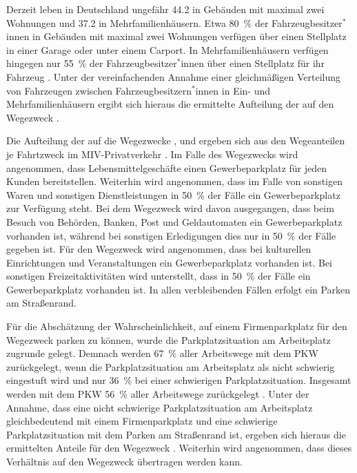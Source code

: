 

Derzeit leben in Deutschland ungefähr \SI{44.2}{\MioMen} in Gebäuden mit maximal zwei Wohnungen und \SI{37.2}{\MioMen} in Mehrfamilienhäusern.
Etwa \SI{80}{\percent} der \linebreak Fahrzeugbesitzer$^*$innen in Gebäuden mit maximal zwei Wohnungen verfügen über einen Stellplatz in einer Garage oder unter einem Carport.
In Mehrfamilienhäusern verfügen hingegen nur \SI{55}{\percent} der Fahrzeugbesitzer$^*$innen über einen Stellplatz für ihr Fahrzeug \cite{dena2020}.
Unter der vereinfachenden Annahme einer gleichmäßigen Verteilung von Fahrzeugen zwischen Fahrzeugbesitzern$^*$innen in Ein- und Mehrfamilienhäusern ergibt sich hieraus die ermittelte Aufteilung der \UCs auf den Wegezweck \nHdot.\medskip

Die Aufteilung der \UCs auf die Wegezwecke \Einkaufdot, \Erledigung und \Freizeit ergeben sich aus den Wegeanteilen je Fahrtzweck im \gls{MIV}-Privatverkehr \cite{Rikus2015}.
Im Falle des Wegezwecks \Einkauf wird angenommen, dass Lebensmittelgeschäfte einen Gewerbeparkplatz für jeden Kunden bereitstellen.
Weiterhin wird angenommen, dass im Falle von sonstigen Waren und sonstigen Dienstleistungen in \SI{50}{\percent} der Fälle ein Gewerbeparkplatz zur Verfügung steht.
Bei dem Wegezweck \Erledigung wird davon ausgegangen, dass beim Besuch von Behörden, Banken, Post und Geldautomaten ein Gewerbeparkplatz vorhanden ist, während bei sonstigen Erledigungen dies nur in \SI{50}{\percent} der Fälle gegeben ist.
Für den Wegezweck \Freizeit wird angenommen, dass bei kulturellen Einrichtungen und Veranstaltungen ein Gewerbeparkplatz vorhanden ist.
Bei sonstigen Freizeitaktivitäten wird unterstellt, dass in \SI{50}{\percent} der Fälle ein Gewerbeparkplatz vorhanden ist.
In allen verbleibenden Fällen erfolgt ein Parken am Straßenrand.\medskip

Für die Abschätzung der Wahrscheinlichkeit, auf einem Firmenparkplatz für den Wegezweck \Arbeit parken zu können, wurde die Parkplatzsituation am Arbeitsplatz zugrunde gelegt.
Demnach werden \SI{67}{\percent} aller Arbeitswege mit dem \gls{PKW} zurückgelegt, wenn die Parkplatzsituation am Arbeitsplatz als nicht schwierig eingestuft wird und nur \SI{36}{\percent} bei einer schwierigen Parkplatzsituation.
Insgesamt werden mit dem \gls{PKW} \SI{56}{\percent} aller Arbeitswege zurückgelegt \cite{Ecke2020}.
Unter der Annahme, dass eine nicht schwierige Parkplatzsituation am Arbeitsplatz gleichbedeutend mit einem Firmenparkplatz und eine schwierige Parkplatzsituation mit dem Parken am Straßenrand ist, ergeben sich hieraus die ermittelten Anteile für den Wegezweck \Arbeitdot.
Weiterhin wird angenommen, dass dieses Verhältnis auf den Wegezweck \Ausbildung übertragen werden kann.\medskip

